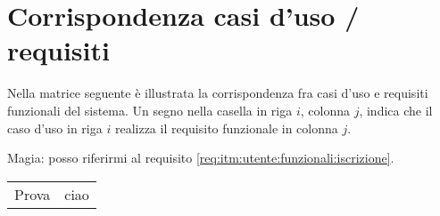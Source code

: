 \section{Corrispondenza casi d'uso / requisiti}

Nella matrice seguente \`e illustrata la corrispondenza fra casi d'uso e requisiti funzionali del sistema.
Un segno nella casella in riga $i$, colonna $j$, indica che il caso d'uso in riga $i$ realizza il requisito funzionale in colonna $j$.

Magia: posso riferirmi al requisito \ref{req:itm:utente:funzionali:iscrizione}.

\begin{tabular}{cc}
	Prova & ciao \\
\end{tabular}
